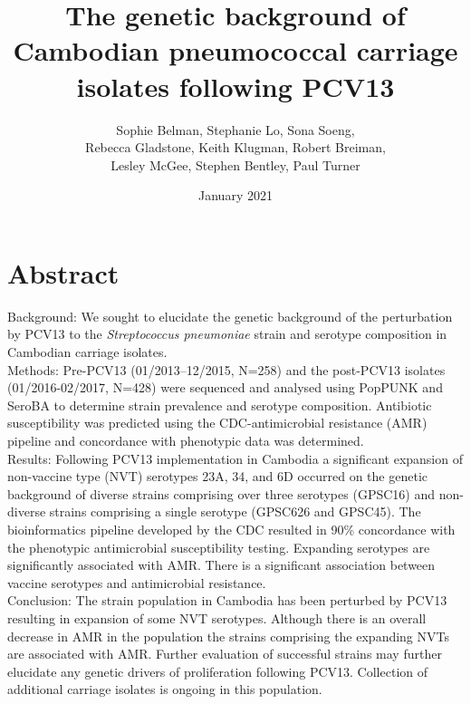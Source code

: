 \documentclass{article}
\title{The genetic background of Cambodian pneumococcal carriage isolates following PCV13}
\author{Sophie Belman, Stephanie Lo, Sona Soeng, 
\\Rebecca Gladstone, Keith Klugman, Robert Breiman, 
\\Lesley McGee, Stephen Bentley, Paul Turner}
\date{January 2021}
\begin{document}
\maketitle
\section{Abstract}
Background: We sought to elucidate the genetic background of the perturbation by PCV13 to the \textit{Streptococcus pneumoniae} strain and serotype composition in Cambodian carriage isolates.
\\Methods: Pre-PCV13 (01/2013–12/2015, N=258) and the post-PCV13 isolates (01/2016-02/2017, N=428) were sequenced and analysed using PopPUNK and SeroBA to determine strain prevalence and serotype composition. Antibiotic susceptibility was predicted using the CDC-antimicrobial resistance (AMR) pipeline and concordance with phenotypic data was determined.
\\Results: Following PCV13 implementation in Cambodia a significant expansion of non-vaccine type (NVT) serotypes 23A, 34, and 6D occurred on the genetic background of diverse strains comprising over three serotypes  (GPSC16) and non-diverse strains comprising a single serotype (GPSC626 and GPSC45). The bioinformatics pipeline developed by the CDC resulted in 90\% concordance with the phenotypic antimicrobial susceptibility testing. Expanding serotypes are significantly associated with AMR. There is a significant association between vaccine serotypes and antimicrobial resistance.
\\Conclusion: The strain population in Cambodia has been perturbed by PCV13 resulting in expansion of some NVT serotypes. Although there is an overall decrease in AMR in the population the strains comprising the expanding NVTs are associated with AMR. Further evaluation of successful strains may further elucidate any genetic drivers of proliferation following PCV13. Collection of additional carriage isolates is ongoing in this population.
\end{document}
